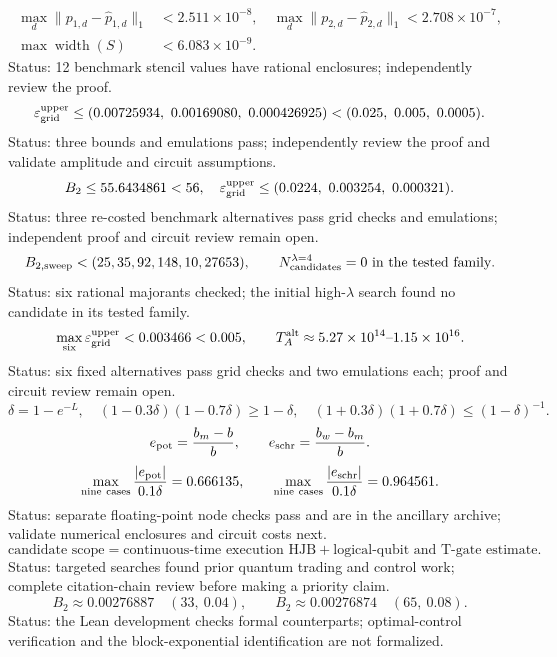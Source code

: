 \documentclass[11pt,a4paper]{article}
\begin{document}
\[
 \begin{aligned}
 \max_d\|p_{1,d}-\widehat p_{1,d}\|_1&<2.511\times10^{-8},\quad
 \max_d\|p_{2,d}-\widehat p_{2,d}\|_1<2.708\times10^{-7},\\
 \max\operatorname{width}(S)&<6.083\times10^{-9}.
 \end{aligned}
\]
Status: 12 benchmark stencil values have rational enclosures; independently review the proof.
\[
 \varepsilon_{\rm grid}^{\rm upper}\le
 (0.00725934,\ 0.00169080,\ 0.000426925)
 < (0.025,\ 0.005,\ 0.0005).
\]
Status: three bounds and emulations pass; independently review the proof and validate amplitude and circuit assumptions.
\[
 B_2\le55.6434861<56,\quad
 \varepsilon_{\rm grid}^{\rm upper}\le(0.0224,\ 0.003254,\ 0.000321).
\]
Status: three re-costed benchmark alternatives pass grid checks and emulations; independent proof and circuit review remain open.
\[
 B_{2,\mathrm{sweep}}<(25,35,92,148,10,27653),\qquad
 N_{\rm candidates}^{\lambda=4}=0\ \text{in the tested family}.
\]
Status: six rational majorants checked; the initial high-$\lambda$ search found no candidate in its tested family.
\[
 \max_{\mathrm{six}}\varepsilon_{\rm grid}^{\rm upper}<0.003466<0.005,
 \qquad T_A^{\rm alt}\approx5.27\times10^{14}\text{--}1.15\times10^{16}.
\]
Status: six fixed alternatives pass grid checks and two emulations each; proof and circuit review remain open.
\[
\delta=1-e^{-L},\quad
(1-0.3\delta)(1-0.7\delta)\ge1-\delta,\quad
(1+0.3\delta)(1+0.7\delta)\le(1-\delta)^{-1}.
\]
\[
e_{\rm pot}=\frac{b_m-b}{b},\qquad e_{\rm schr}=\frac{b_w-b_m}{b}.
\]
\[
\max_{\rm nine\ cases}\frac{|e_{\rm pot}|}{0.1\delta}=0.666135,\qquad
\max_{\rm nine\ cases}\frac{|e_{\rm schr}|}{0.1\delta}=0.964561.
\]
Status: separate floating-point node checks pass and are in the ancillary archive; validate numerical enclosures and circuit costs next.
\[
\text{candidate scope}=\text{continuous-time execution HJB}
 +\text{logical-qubit and T-gate estimate}.
\]
Status: targeted searches found prior quantum trading and control work; complete citation-chain review before making a priority claim.
\[
 B_2\approx0.00276887\quad(33,\ 0.04),\qquad
 B_2\approx0.00276874\quad(65,\ 0.08).
\]
Status: the Lean development checks formal counterparts; optimal-control
verification and the block-exponential identification are not formalized.
\end{document}
